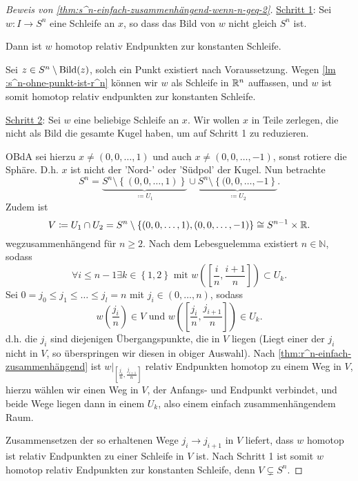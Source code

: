 \begin{proof}[Beweis von \autoref{thm:s^n-einfach-zusammenhängend-wenn-n-geq-2}]
    \underline{Schritt 1}: Sei  $w\colon I \to  S^n$ eine Schleife an $x$, so dass das Bild von  $w$ nicht gleich  $S^n$ ist.
    \begin{claim}
        Dann ist $w$ homotop relativ Endpunkten zur konstanten Schleife.
    \end{claim}
    \begin{subproof}
        Sei $z\in S^n \setminus \operatorname{Bild}(z)$, solch ein Punkt existiert nach Voraussetzung. Wegen \autoref{lm :s^n-ohne-punkt-ist-r^n}  können wir $w$ als Schleife in  $\mathbb{R}^n$ auffassen, und $w$ ist somit homotop relativ endpunkten zur konstanten Schleife.
    \end{subproof}
    \underline{Schritt 2}: Sei $w$ eine beliebige Schleife an $x$. Wir wollen $x$ in Teile zerlegen, die nicht als Bild die gesamte Kugel haben, um auf Schritt 1 zu reduzieren.

    OBdA sei hierzu  $x\neq (0,0,\ldots,1)$ und auch $x\neq  (0,0,\ldots,-1)$, sonst rotiere die Sphäre. D.h. $x$ ist nicht der 'Nord-' oder 'Südpol' der Kugel. Nun betrachte
     \[
         S^n = \underbrace{S^n \setminus \left \{(0,0,\ldots,1)\right\}}_{\coloneqq  U_1} \cup \underbrace{S^n \setminus \left \{(0,0,\ldots,-1\right\}}_{\coloneqq  U_2} 
    .\] 
    Zudem ist
    \[
    V \coloneqq  U_1 \cap U_2 = S^n \setminus \left \{(0,0,\ldots,1) , (0,0,\ldots,-1)\right\}  \cong S^{n-1}\times \mathbb{R}
    .\] 
    wegzusammenhängend für $n\geq 2$. Nach dem Lebesguelemma existiert $n\in \mathbb{N}$, sodass
    \[
        \forall i\leq n-1 \exists k\in \left \{1,2\right\} \text{ mit } w\left( \left[ \frac{i}{n},\frac{i+1}{n} \right]  \right) \subset U_k
    .\] 
    Sei $0 = j_0 \leq  j_1 \leq  \ldots \leq j_l = n$ mit $j_i \in (0,\ldots,n)$, sodass
    \[
        w\left( \frac{j_i}{n} \right) \in V \text{ und } w\left( \left[ \frac{j_i}{n}, \frac{j_{i+1}}{n} \right]  \right) \in  U_k
    .\] 
    d.h. die $j_i$ sind diejenigen Übergangspunkte, die in  $V$ liegen (Liegt einer der $j_i$ nicht in  $V$, so überspringen wir diesen in obiger Auswahl). Nach  \autoref{thm:r^n-einfach-zusammenhängend} ist $w|_{\left[ \frac{j_i}{n}, \frac{j_{i+1}}{n} \right] }$ relativ Endpunkten homotop zu einem Weg in $V$, hierzu wählen wir einen Weg in  $V$, der Anfangs- und Endpunkt verbindet, und beide Wege liegen dann in einem $U_k$, also einem einfach zusammenhängendem Raum.

    Zusammensetzen der so erhaltenen Wege $j_i \to  j_{i+1}$ in $V$ liefert, dass $w$ homotop ist relativ Endpunkten zu einer Schleife in  $V$ ist. Nach Schritt 1 ist somit $w$ homotop relativ Endpunkten zur konstanten Schleife, denn  $V \subsetneq S^n$.
\end{proof}

